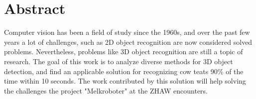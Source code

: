 \chapter*{Abstract}

Computer vision has been a field of study since the 1960s, and over the past few years a lot of challenges, such as 2D object recognition are now considered solved problems. Nevertheless, problems like 3D object recognition are still a topic of research. 
The goal of this work is to analyze diverse methods for 3D object detection, and find an applicable solution for recognizing cow teats 90\% of the time within 10 seconds. 
The work contributed by this solution will help solving the challenges the project "Melkroboter" at the ZHAW encounters.